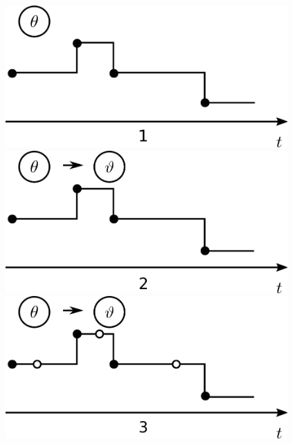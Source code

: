 \setlength{\unitlength}{0.8cm}
  \begin{figure}[h!]
  \centering
  \begin{minipage}[!hp]{0.32\linewidth}
  \centering
    \includegraphics [width=0.96\textwidth, angle=0]{figs/plot0.png}
      \end{minipage}
  \begin{minipage}[hp]{0.32\linewidth}
  \centering
    \includegraphics [width=0.96\textwidth, angle=0]{figs/plot1.png}
    \vspace{-0 in}
  \end{minipage}
  \begin{minipage}[hp]{0.32\linewidth}
  \centering
    \includegraphics [width=0.96\textwidth, angle=0]{figs/plot2.png}

\end{minipage}
\end{figure}
